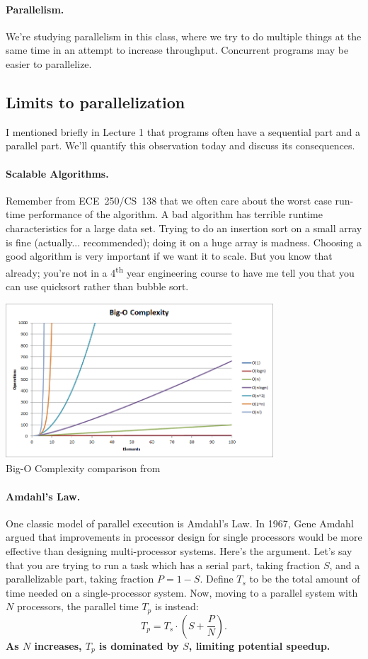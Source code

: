 \documentclass[a4paper]{report}
\begin{document}
\paragraph{Parallelism.} We're studying parallelism in this class, where
we try to do multiple things at the same time in an attempt to increase
throughput. Concurrent programs may be easier to parallelize.

\subsection*{Limits to parallelization}
I mentioned briefly in Lecture 1 that programs often have a sequential
part and a parallel part. We'll quantify this observation today
and discuss its consequences.

\paragraph{Scalable Algorithms.} 
Remember from ECE~250/CS~138 that we often care about the worst case run-time performance of the algorithm. A bad algorithm has terrible runtime characteristics for a large data set. Trying to do an insertion sort on a small array is fine (actually... recommended); doing it on a huge array is madness. Choosing a good algorithm is very important if we want it to scale.  But you know that already; you're not in a 4\textsuperscript{th} year engineering course to have me tell you that you can use quicksort rather than bubble sort.

\begin{center}
	\includegraphics[width=0.75\textwidth]{images/big-o-complexity}\\
	Big-O Complexity comparison from ~\cite{bigocheatsheet}
\end{center}


\paragraph{Amdahl's Law.} One classic model of parallel execution
is Amdahl's Law. In 1967, Gene Amdahl argued that improvements in
processor design for single processors would be more effective than
designing multi-processor systems. Here's the argument. Let's say that
you are trying to run a task which has a serial part, taking fraction 
$S$, and a parallelizable part, taking fraction $P = 1-S$. Define $T_s$
to be the total 
amount of time needed on a single-processor system.
Now, moving to a parallel system with $N$ processors, the parallel
time $T_p$ is instead:
\[ T_p = T_s \cdot (S + \frac{P}{N}). \]
{\bf As $N$ increases, $T_p$ is dominated by $S$, limiting potential
speedup.}
\end{document}
